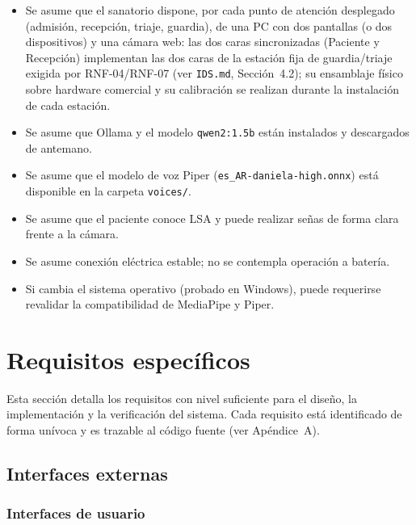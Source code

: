 \begin{itemize}
    \item Se asume que el sanatorio dispone, por cada punto de atención desplegado (admisión, recepción, triaje, guardia), de una PC con dos pantallas (o dos dispositivos) y una cámara web: las dos caras sincronizadas (Paciente y Recepción) implementan las dos caras de la estación fija de guardia/triaje exigida por RNF-04/RNF-07 (ver \texttt{IDS.md}, Sección~4.2); su ensamblaje físico sobre hardware comercial y su calibración se realizan durante la instalación de cada estación.
    \item Se asume que Ollama y el modelo \texttt{qwen2:1.5b} están instalados y descargados de antemano.
    \item Se asume que el modelo de voz Piper (\texttt{es\_AR-daniela-high.onnx}) está disponible en la carpeta \texttt{voices/}.
    \item Se asume que el paciente conoce LSA y puede realizar señas de forma clara frente a la cámara.
    \item Se asume conexión eléctrica estable; no se contempla operación a batería.
    \item Si cambia el sistema operativo (probado en Windows), puede requerirse revalidar la compatibilidad de MediaPipe y Piper.
\end{itemize}

\section{Requisitos específicos}

Esta sección detalla los requisitos con nivel suficiente para el diseño,
la implementación y la verificación del sistema. Cada requisito está
identificado de forma unívoca y es trazable al código fuente (ver
Apéndice~A).

\subsection{Interfaces externas}

\subsubsection{Interfaces de usuario}

